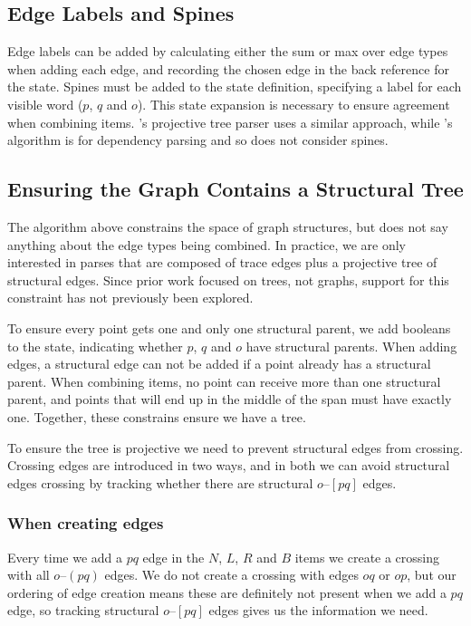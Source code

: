 \subsection{Edge Labels and Spines}\label{sec:labels}
Edge labels can be added by calculating either the sum or max over edge types when adding each edge, and recording the chosen edge in the back reference for the state.
Spines must be added to the state definition, specifying a label for each visible word ($p$, $q$ and $o$).
This state expansion is necessary to ensure agreement when combining items.
\textcite{cck}'s projective tree parser uses a similar approach, while \textcite{ec}'s algorithm is for dependency parsing and so does not consider spines.

\subsection{Ensuring the Graph Contains a Structural Tree}
The algorithm above constrains the space of graph structures, but does not say anything about the edge types being combined.
In practice, we are only interested in parses that are composed of trace edges plus a projective tree of structural edges.
Since prior work focused on trees, not graphs, support for this constraint has not previously been explored.

To ensure every point gets one and only one structural parent, we add booleans to the state, indicating whether $p$, $q$ and $o$ have structural parents.
When adding edges, a structural edge can not be added if a point already has a structural parent.
When combining items, no point can receive more than one structural parent, and points that will end up in the middle of the span must have exactly one.
Together, these constrains ensure we have a tree.

To ensure the tree is projective we need to prevent structural edges from crossing.
Crossing edges are introduced in two ways, and in both we can avoid structural edges crossing by tracking whether there are structural $o$--$[pq]$ edges.

\subsubsection{When creating edges}
Every time we add a $pq$ edge in the $N$, $L$, $R$ and $B$ items we create a crossing with all $o$--$(pq)$ edges.
We do not create a crossing with edges $oq$ or $op$, but our ordering of edge creation means these are definitely not present when we add a $pq$ edge, so tracking structural $o$--$[pq]$ edges gives us the information we need.


